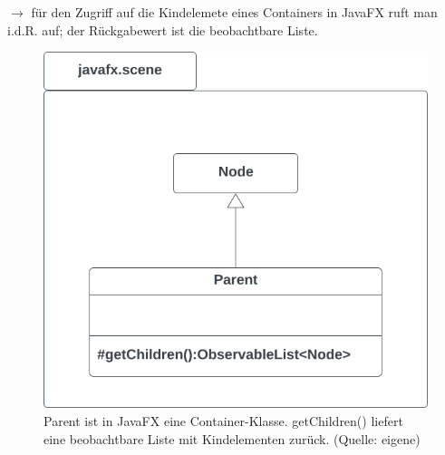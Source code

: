 \noindent
$\rightarrow$ für den Zugriff auf die Kindelemete eines Containers in JavaFX ruft man i.d.R.  auf; der Rückgabewert ist die beobachtbare Liste.

\begin{figure}
    \centering
    \includegraphics[scale=0.5]{chapters/fopt3/img/javafx/nodeparent}
    \caption{Parent ist in JavaFX eine Container-Klasse. getChildren() liefert eine beobachtbare Liste mit Kindelementen zurück. (Quelle: eigene)}
    \label{fig:nodeparent}
\end{figure}